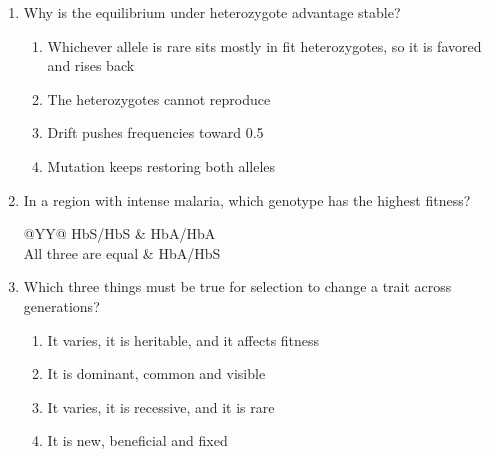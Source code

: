 \documentclass[11pt]{article}
\newcommand{\work}[1]{\par\vspace{#1}}
\begin{document}
\begin{enumerate}[label=\textbf{\arabic*.}, leftmargin=2em, itemsep=1.4em]
\begin{tabularx}{\linewidth}{@{}YYYY@{}}
\end{tabularx}
\work{1.6cm}
\item Why is the equilibrium under heterozygote advantage stable?
\par\smallskip
\begin{enumerate}[label={}, leftmargin=2.4em, labelwidth=0pt, itemsep=2pt, topsep=0pt]
\item \hspace*{-2.4em}Whichever allele is rare sits mostly in fit heterozygotes, so it is favored and rises back
\item \hspace*{-2.4em}The heterozygotes cannot reproduce
\item \hspace*{-2.4em}Drift pushes frequencies toward 0.5
\item \hspace*{-2.4em}Mutation keeps restoring both alleles
\end{enumerate}
\item In a region with intense malaria, which genotype has the highest fitness?
\par\smallskip\noindent\begin{tabularx}{\linewidth}{@{}YY@{}}
HbS/HbS & HbA/HbA \\[3pt]
All three are equal & HbA/HbS \\
\end{tabularx}
\item Which three things must be true for selection to change a trait across generations?
\par\smallskip
\begin{enumerate}[label={}, leftmargin=2.4em, labelwidth=0pt, itemsep=2pt, topsep=0pt]
\item \hspace*{-2.4em}It varies, it is heritable, and it affects fitness
\item \hspace*{-2.4em}It is dominant, common and visible
\item \hspace*{-2.4em}It varies, it is recessive, and it is rare
\item \hspace*{-2.4em}It is new, beneficial and fixed

\end{enumerate}
\end{enumerate}
\end{document}
